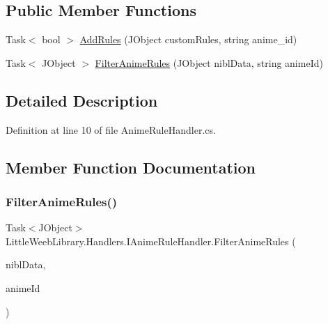 \subsection*{Public Member Functions}
\begin{DoxyCompactItemize}
\item 
Task$<$ bool $>$ \mbox{\hyperlink{interface_little_weeb_library_1_1_handlers_1_1_i_anime_rule_handler_ae8bcf661c81733b24b52ce3e180aeac1}{Add\+Rules}} (J\+Object custom\+Rules, string anime\+\_\+id)
\item 
Task$<$ J\+Object $>$ \mbox{\hyperlink{interface_little_weeb_library_1_1_handlers_1_1_i_anime_rule_handler_ad82316c84b3b1a7870ff94107b420cc6}{Filter\+Anime\+Rules}} (J\+Object nibl\+Data, string anime\+Id)
\end{DoxyCompactItemize}


\subsection{Detailed Description}


Definition at line 10 of file Anime\+Rule\+Handler.\+cs.



\subsection{Member Function Documentation}
\mbox{\label{interface_little_weeb_library_1_1_handlers_1_1_i_anime_rule_handler_ad82316c84b3b1a7870ff94107b420cc6}} 
\subsubsection{\texorpdfstring{Filter\+Anime\+Rules()}{FilterAnimeRules()}}
{\footnotesize\ttfamily Task$<$J\+Object$>$ Little\+Weeb\+Library.\+Handlers.\+I\+Anime\+Rule\+Handler.\+Filter\+Anime\+Rules (\begin{DoxyParamCaption}\item[{J\+Object}]{nibl\+Data,  }\item[{string}]{anime\+Id }\end{DoxyParamCaption})}



